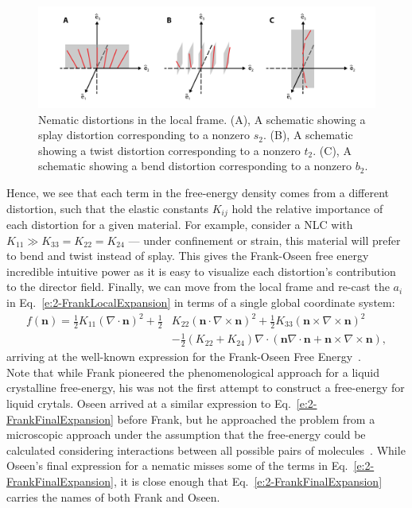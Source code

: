 \begin{figure}
  \centering
  \includegraphics{figures/C2/Ch2-Figs_FrankDist.png}
  \caption{Nematic distortions in the local frame. (A), A schematic showing a splay distortion corresponding to a nonzero $s_2$.
  (B), A schematic showing a twist distortion corresponding to a nonzero $t_2$.
  (C), A schematic showing a bend distortion corresponding to a nonzero $b_2$.}
  \label{f:2-FrankDist}
\end{figure}
Hence, we see that each term in the free-energy density comes from a different distortion, such that the elastic constants $K_{ij}$ hold the relative importance of each distortion for a given material.
For example, consider a NLC with $K_{11} \gg K_{33} = K_{22} = K_{24}$ --- under confinement or strain, this material will prefer to bend and twist instead of splay.
This gives the Frank-Oseen free energy incredible intuitive power as it is easy to visualize each distortion's contribution to the director field.
Finally, we can move from the local frame and re-cast the $a_i$ in Eq.~\ref{e:2-FrankLocalExpansion} in terms of a single global coordinate system:
\begin{align}
  f(\mathbf{n}) = \frac{1}{2}K_{11} (\nabla \cdot \mathbf{n})^2 + \frac{1}{2}&K_{22} (\mathbf{n} \cdot \nabla \times \mathbf{n})^2 + \frac{1}{2}K_{33} (\mathbf{n} \times \nabla \times \mathbf{n})^2 \nonumber \\
    & - \frac{1}{2}(K_{22} + K_{24}) \nabla \cdot (\mathbf{n}\nabla \cdot \mathbf{n} + \mathbf{n} \times \nabla \times \mathbf{n}),\label{e:2-FrankFinalExpansion}
\end{align}
arriving at the well-known expression for the Frank-Oseen Free Energy~\cite{RN61}.\\

Note that while Frank pioneered the phenomenological approach for a liquid crystalline free-energy, his was not the first attempt to construct a free-energy for liquid crytals.
Oseen arrived at a similar expression to Eq.~\ref{e:2-FrankFinalExpansion} before Frank, but he approached the problem from a microscopic approach under the assumption that the free-energy could be calculated considering interactions between all possible pairs of molecules~.
While Oseen's final expression for a nematic misses some of the terms in Eq.~\ref{e:2-FrankFinalExpansion}, it is close enough that Eq.~\ref{e:2-FrankFinalExpansion} carries the names of both Frank and Oseen.


